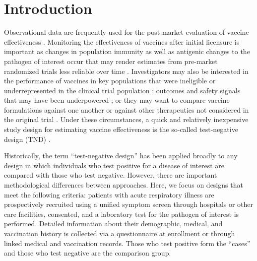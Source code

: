 \documentclass[11pt]{article}
\begin{document}

\section{Introduction} \label{sec:introduction}
Observational data are frequently used for the post-market evaluation of vaccine effectiveness \cite{chua_use_2020-1,dean_covid-19_2021,patel_postlicensure_2020}. Monitoring the effectiveness of vaccines after initial licensure is important as changes in population immunity as well as antigenic changes to the pathogen of interest occur that may render estimates from pre-market randomized trials less reliable over time \cite{hitchings_effectiveness_2021,israel_elapsed_2021}. Investigators may also be interested in the performance of vaccines in key populations that were ineligible or underrepresented in the clinical trial population \cite{olson_effectiveness_2022}; outcomes and safety signals that may have been underpowered \cite{thompson_effectiveness_2021}; or they may want to compare vaccine formulations against one another or against other therapeutics not considered in the original trial \cite{skowronski_two-dose_2022}. Under these circumstances, a quick and relatively inexpensive study design for estimating vaccine effectiveness is the so-called test-negative design (TND) \cite{sullivan_potential_2014,jackson_test-negative_2013}. 
 
Historically, the term ``test-negative design'' has been applied broadly to any design in which individuals who test positive for a disease of interest are compared with those who test negative. However, there are important methodological differences between approaches. Here, we focus on designs that meet the following criteria: patients with acute respiratory illness are prospectively recruited using a unified symptom screen through hospitals or other care facilities, consented, and a laboratory test for the pathogen of interest is performed. Detailed information about their demographic, medical, and vaccination history is collected via a questionnaire at enrollment or through linked medical and vaccination records. Those who test positive form the ``cases'' and those who test negative are the comparison group. 
\end{document}
